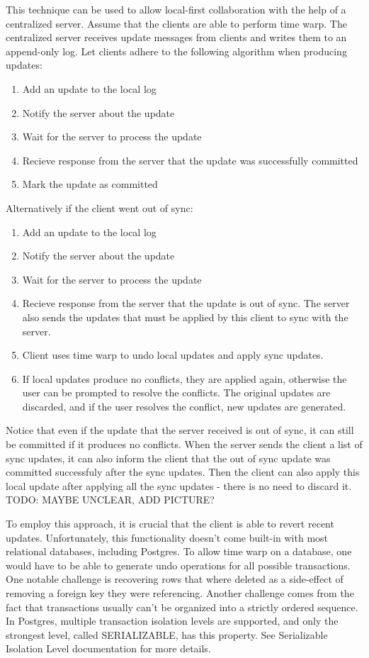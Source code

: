 \documentclass[a4paper, 11pt, oneside]{article}
\theoremstyle{definition}
\begin{document}
This technique can be used to allow local-first collaboration with the help of a centralized server. Assume that the clients are able to perform time warp. The centralized server receives update messages from clients and writes them to an append-only log. Let clients adhere to the following algorithm when producing updates:

\begin{enumerate}
    \item Add an update to the local log
    \item Notify the server about the update
    \item Wait for the server to process the update
    \item Recieve response from the server that the update was successfully committed
    \item Mark the update as committed
\end{enumerate}

Alternatively if the client went out of sync:

\begin{enumerate}
    \item Add an update to the local log
    \item Notify the server about the update
    \item Wait for the server to process the update
    \item Recieve response from the server that the update is out of sync. The server also sends the updates that must be applied by this client to sync with the server.
    \item Client uses time warp to undo local updates and apply sync updates.
    \item If local updates produce no conflicts, they are applied again, otherwise the user can be prompted to resolve the conflicts. The original updates are discarded, and if the user resolves the conflict, new updates are generated.
\end{enumerate}

Notice that even if the update that the server received is out of sync, it can still be committed if it produces no conflicts. When the server sends the client a list of sync updates, it can also inform the client that the out of sync update was committed successfuly after the sync updates. Then the client can also apply this local update after applying all the sync updates - there is no need to discard it. TODO: MAYBE UNCLEAR, ADD PICTURE?

To employ this approach, it is crucial that the client is able to revert recent updates. Unfortunately, this functionality doesn't come built-in with most relational databases, including Postgres. To allow time warp on a database, one would have to be able to generate undo operations for all possible transactions. One notable challenge is recovering rows that where deleted as a side-effect of removing a foreign key they were referencing. Another challenge comes from the fact that transactions usually can't be organized into a strictly ordered sequence. In Postgres, multiple transaction isolation levels are supported, and only the strongest level, called SERIALIZABLE, has this property. See Serializable Isolation Level documentation \cite{tisolevel} for more details.
\end{document}
